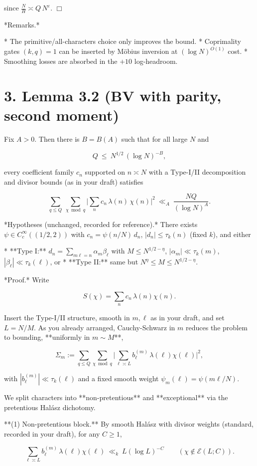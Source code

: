 \documentclass[11pt]{article}
\theoremstyle{definition}
\theoremstyle{remark}
\begin{document}
since $\frac{N}{H}\asymp Q\,N^{\varepsilon}$. $\Box$

*Remarks.*

* The primitive/all-characters choice only improves the bound.
* Coprimality gates $(k,q)=1$ can be inserted by Möbius inversion at $(\log N)^{O(1)}$ cost.
* Smoothing losses are absorbed in the $+10$ log-headroom.


\section*{3. Lemma 3.2 (BV with parity, second moment)}
Fix $A>0$. Then there is $B=B(A)$ such that for all large $N$ and

$$
Q\ \le\ N^{1/2}\,(\log N)^{-B},
$$

every coefficient family $c_n$ supported on $n\asymp N$ with a Type-I/II decomposition and divisor bounds (as in your draft) satisfies

$$
\sum_{q\le Q}\ \sum_{\chi\bmod q}
\Bigg|\sum_{n} c_n\,\lambda(n)\,\chi(n)\Bigg|^2
\ \ll_{A}\ \frac{NQ}{(\log N)^A}.
$$

*Hypotheses (unchanged, recorded for reference).*
There exists $\psi\in C_c^\infty((1/2,2))$ with $c_n=\psi(n/N)\,d_n$, $|d_n|\le \tau_k(n)$ (fixed $k$), and either

* **Type I:** $d_n=\sum_{m\ell=n}\alpha_m\beta_\ell$ with $M\le N^{1/2-\eta}$, $|\alpha_m|\ll \tau_k(m)$, $|\beta_\ell|\ll \tau_k(\ell)$, or
* **Type II:** same but $N^{\eta}\le M\le N^{1/2-\eta}$.

*Proof.* Write

$$
S(\chi)=\sum_{n} c_n\,\lambda(n)\chi(n).
$$

Insert the Type-I/II structure, smooth in $m,\ell$ as in your draft, and set $L=N/M$. As you already arranged, Cauchy-Schwarz in $m$ reduces the problem to bounding, **uniformly in $m\sim M$**,

$$
\Sigma_m:=\sum_{q\le Q}\sum_{\chi\bmod q}\Big|\sum_{\ell\asymp L} b^{(m)}_\ell\,\lambda(\ell)\chi(\ell)\Big|^2,
$$

with $|b^{(m)}_\ell|\ll \tau_k(\ell)$ and a fixed smooth weight $\psi_m(\ell)=\psi(m\ell/N)$.

We split characters into **non-pretentious** and **exceptional** via the pretentious Halász dichotomy.

**(1) Non-pretentious block.**
By smooth Halász with divisor weights (standard, recorded in your draft), for any $C\ge 1$,

$$
\sum_{\ell\asymp L} b^{(m)}_\ell\,\lambda(\ell)\chi(\ell)\ \ll_k\ L(\log L)^{-C}
\qquad(\chi\notin\mathcal E(L;C)).
$$
\end{document}
